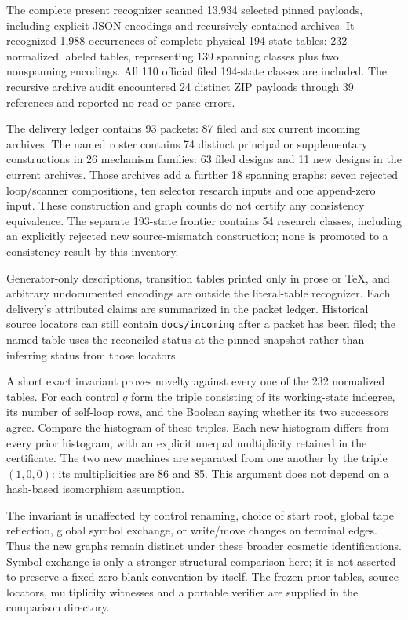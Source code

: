 The complete present recognizer scanned 13,934 selected pinned payloads,
including explicit JSON encodings and recursively contained archives. It
recognized 1,988 occurrences of complete physical 194-state tables: 232
normalized labeled tables, representing 139 spanning classes plus two
nonspanning encodings. All 110 official filed 194-state classes are included.
The recursive archive audit encountered 24 distinct ZIP payloads through
39 references and reported no read or parse errors.

The delivery ledger contains 93 packets: 87 filed and six current incoming
archives. The named roster contains 74 distinct principal or supplementary
constructions in 26 mechanism families: 63 filed designs and 11 new designs
in the current archives. Those archives add a further 18 spanning graphs:
seven rejected loop/scanner compositions, ten selector research inputs and
one append-zero input. These construction and graph counts do not certify
any consistency equivalence. The separate 193-state frontier contains 54
research classes, including an explicitly rejected new source-mismatch
construction; none is promoted to a consistency result by this inventory.

Generator-only descriptions, transition tables printed only in prose or
TeX, and arbitrary undocumented encodings are outside the literal-table
recognizer. Each delivery's attributed claims are summarized in the packet
ledger. Historical source locators can still contain \texttt{docs/incoming}
after a packet has been filed; the named table uses the reconciled status
at the pinned snapshot rather than inferring status from those locators.

A short exact invariant proves novelty against every one of the 232
normalized tables. For each control $q$ form the triple consisting of its
working-state indegree, its number of self-loop rows, and the Boolean saying
whether its two successors agree. Compare the histogram of these triples.
Each new histogram differs from every prior histogram, with an explicit
unequal multiplicity retained in the certificate. The two new machines
are separated from one another by the triple $(1,0,0)$: its multiplicities
are 86 and 85. This argument does not depend on a hash-based isomorphism
assumption.

The invariant is unaffected by control renaming, choice of start root,
global tape reflection, global symbol exchange, or write/move changes on
terminal edges. Thus the new graphs remain distinct under these broader
cosmetic identifications. Symbol exchange is only a stronger structural
comparison here; it is not asserted to preserve a fixed zero-blank
convention by itself. The frozen prior tables, source locators, multiplicity
witnesses and a portable verifier are supplied in the comparison directory.

